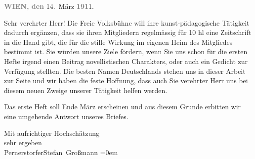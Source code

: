 \pstart
           \raggedleft{}\textcolor{gray}{\textbf{WIEN, den}}{ }14. März \textcolor{gray}{\textbf{191}}1.\pend
           
\pstart\center{}Sehr verehrter Herr!\pend\vspace{0.5em}
\pstart
           Die Freie Volksbühne will ihre kunst-pädagogische
               Tätigkeit dadurch ergänzen, dass sie ihren Mitgliedern regelmässig für 10 hl eine Zeitschrift in die Hand gibt,
               die für die stille Wirkung im eigenen Heim des Mitgliedes bestimmt ist. Sie würden
               unsere Ziele fördern, wenn Sie uns schon für die ersten Hefte irgend einen Beitrag
               novellistischen Charakters, oder auch ein Gedicht zur Verfügung stellten. Die besten
               Namen Deutschlands stehen uns in dieser Arbeit zur Seite und wir haben die feste
               Hoffnung, dass auch Sie verehrter Herr uns bei diesem neuen Zweige unserer Tätigkeit
               helfen werden.\pend
           
\pstart
           Das erste Heft soll Ende
                  März erscheinen und aus diesem Grunde erbitten wir eine umgehende Antwort
               unseres Briefes.\pend
           
\pstart
           Mit aufrichtiger Hochschätzung{\\[\baselineskip]} sehr ergeben{\\[\baselineskip]}\spacefill\mbox{Pernerstorfer}\hspace*{1.5em}\spacefill\mbox{Stefan Großmann}\pend
           \leftskip=0em{}\endnumbering{}  
      